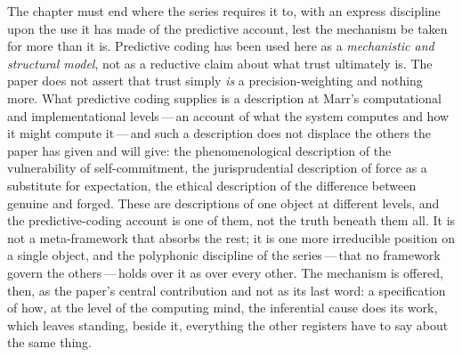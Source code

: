 The chapter must end where the series requires it to, with an express discipline upon the use it has made of the predictive account, lest the mechanism be taken for more than it is. Predictive coding has been used here as a \emph{mechanistic and structural model}, not as a reductive claim about what trust ultimately is. The paper does not assert that trust simply \emph{is} a precision-weighting and nothing more. What predictive coding supplies is a description at Marr's computational and implementational levels\,---\,an account of what the system computes and how it might compute it\,---\,and such a description does not displace the others the paper has given and will give: the phenomenological description of the vulnerability of self-commitment, the jurisprudential description of force as a substitute for expectation, the ethical description of the difference between genuine and forged. These are descriptions of one object at different levels, and the predictive-coding account is one of them, not the truth beneath them all. It is not a meta-framework that absorbs the rest; it is one more irreducible position on a single object, and the polyphonic discipline of the series\,---\,that no framework govern the others\,---\,holds over it as over every other. The mechanism is offered, then, as the paper's central contribution and not as its last word: a specification of how, at the level of the computing mind, the inferential cause does its work, which leaves standing, beside it, everything the other registers have to say about the same thing.
